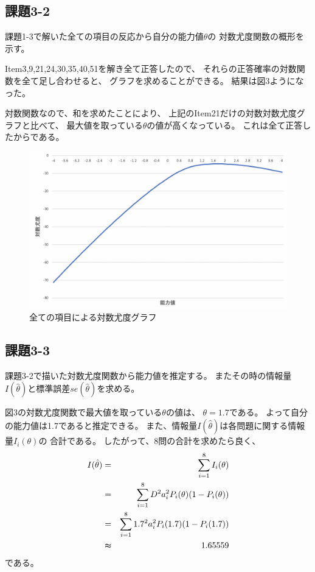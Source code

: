 \documentclass[12pt]{jarticle}
\begin{document}
\subsection{課題3-2}
\begin{shadebox}
    課題1-3で解いた全ての項目の反応から自分の能力値$\theta$の
    対数尤度関数の概形を示す。
\end{shadebox}

Item3,9,21,24,30,35,40,51を解き全て正答したので、
それらの正答確率の対数関数を全て足し合わせると、
グラフを求めることができる。
結果は図3ようになった。

対数関数なので、和を求めたことにより、
上記のItem21だけの対数対数尤度グラフと比べて、
最大値を取っている$\theta$の値が高くなっている。
これは全て正答したからである。

\begin{figure}[h]
    \begin{center}
        \includegraphics[scale=0.4]{kadai5_3_3.png}
    \end{center}
    \caption{全ての項目による対数尤度グラフ}
\end{figure}
\clearpage

\subsection{課題3-3}
\begin{shadebox}
    課題3-2で描いた対数尤度関数から能力値を推定する。
    またその時の情報量$I(\hat{\theta})$と標準誤差$se(\hat{\theta})$を求める。
\end{shadebox}

図3の対数尤度関数で最大値を取っている$\theta$の値は、
$\theta=1.7$である。
よって自分の能力値は1.7であると推定できる。
また、情報量$I(\hat{\theta})$は各問題に関する情報量$I_i({\theta})$の
合計である。
したがって、8問の合計を求めたら良く、
\begin{eqnarray*}
    I(\hat{\theta})&=&\sum_{i=1}^{8}{I_i({\theta})}\\
    &=&\sum_{i=1}^{8}{D^2a_i^2P_i(\theta)(1-P_i(\theta))}\\
    &=&\sum_{i=1}^{8}{1.7^2a_i^2P_i(1.7)(1-P_i(1.7))}\\
    &\thickapprox & 1.65559
\end{eqnarray*}
である。
\end{document}
